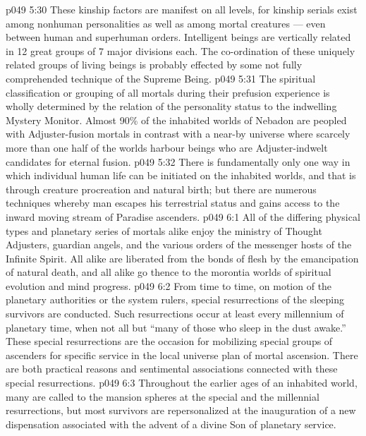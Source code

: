 \vs p049 5:30 These kinship factors are manifest on all levels, for kinship serials exist among nonhuman personalities as well as among mortal creatures --- even between human and superhuman orders. Intelligent beings are vertically related in 12 great groups of 7 major divisions each. The co\hyp{}ordination of these uniquely related groups of living beings is probably effected by some not fully comprehended technique of the Supreme Being.
\vs p049 5:31 \bibnobreakspace {} The spiritual classification or grouping of all mortals during their prefusion experience is wholly determined by the relation of the personality status to the indwelling Mystery Monitor. Almost 90\% of the inhabited worlds of Nebadon are peopled with Adjuster\hyp{}fusion mortals in contrast with a near\hyp{}by universe where scarcely more than one half of the worlds harbour beings who are Adjuster\hyp{}indwelt candidates for eternal fusion.
\vs p049 5:32 \bibnobreakspace {} There is fundamentally only one way in which individual human life can be initiated on the inhabited worlds, and that is through creature procreation and natural birth; but there are numerous techniques whereby man escapes his terrestrial status and gains access to the inward moving stream of Paradise ascenders.
\vs p049 6:1 All of the differing physical types and planetary series of mortals alike enjoy the ministry of Thought Adjusters, guardian angels, and the various orders of the messenger hosts of the Infinite Spirit. All alike are liberated from the bonds of flesh by the emancipation of natural death, and all alike go thence to the morontia worlds of spiritual evolution and mind progress.
\vs p049 6:2 From time to time, on motion of the planetary authorities or the system rulers, special resurrections of the sleeping survivors are conducted. Such resurrections occur at least every millennium of planetary time, when not all but “many of those who sleep in the dust awake.” These special resurrections are the occasion for mobilizing special groups of ascenders for specific service in the local universe plan of mortal ascension. There are both practical reasons and sentimental associations connected with these special resurrections.
\vs p049 6:3 Throughout the earlier ages of an inhabited world, many are called to the mansion spheres at the special and the millennial resurrections, but most survivors are repersonalized at the inauguration of a new dispensation associated with the advent of a divine Son of planetary service.

